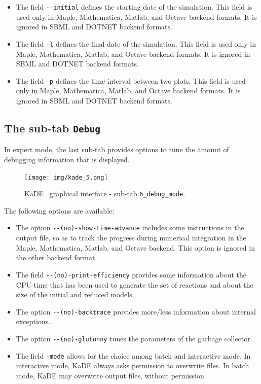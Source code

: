 \documentclass[11pt]{book}
\def\KaDE{\textsf{KaDE}}
\begin{document}
\begin{itemize}
  \item The field \texttt{-{}-initial} defines the starting date of the simulation. This field is used only in Maple, Mathematica, Matlab, and Octave backend formats.
  It is ignored in SBML and DOTNET backend formats.
  \item The field \texttt{-l} defines the final date of the simulation. This field is used only in Maple, Mathematica, Matlab, and Octave backend formats.
  It is ignored in SBML and DOTNET backend formats.
  \item The field \texttt{-p} defines the time interval between two plots. This field is used only in Maple, Mathematica, Matlab, and Octave backend formats.
  It is ignored in SBML and DOTNET backend formats.
\end{itemize}

\subsection{The sub-tab \texttt{Debug}}
\label{kade:debug}
In expert mode, the last sub-tab provides options to tune the amount of debugging information that is displayed.

\begin{figure}[htbp]
\centering
\texttt{[image: img/kade\_5.png]}
\caption{\KaDE~ graphical interface - sub-tab \texttt{6\_debug\_mode}.}
\label{fig:kade:6}
\end{figure}

The following options are available:
\begin{itemize}
\item The option \texttt{-{}-(no)-show-time-advance} includes some
instructions in the output file, so as to track the progress during numerical integration in the Maple, Mathematica, Matlab, and Octave backend.
This option is ignored in the other backend format.

\item The field \texttt{-{}-(no)-print-efficiency} provides some information about the CPU time that has been used to generate the set of reactions and about the size of the initial and reduced models.

\item The option \texttt{-{}-(no)-backtrace} provides more/less information about internal exceptions.
\item The option \texttt{-{}-(no)-glutonny} tunes the parameters of the garbage collector.
\item The field \texttt{-mode} allows for the choice among batch and interactive mode. In interactive mode, {\KaDE} always asks  permission to  overwrite files. In batch mode, {\KaDE} may overwrite output files, without permission.
\end{itemize}
\end{document}
